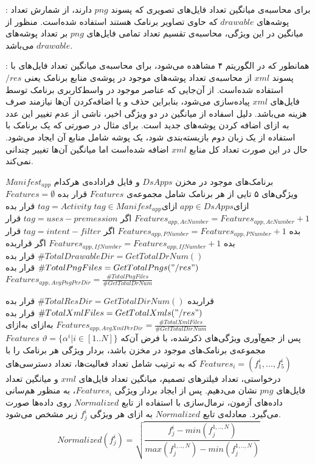 : برای محاسبه‌ی میانگین تعداد فایل‌های تصویری که پسوند $png$ دارند، از شمارش تعداد پوشه‌های $drawable$ که حاوی تصاویر برنامک هستند استفاده شده‌است. منظور از میانگین در این ویژگی، محاسبه‌ی تقسیم تعداد تمامی فایل‌های $png$ بر تعداد پوشه‌های $drawable$ می‌باشد.

:  همانطور که در الگوریتم ۴ مشاهده می‌شود، برای محاسبه‌ی میانگین تعداد فایل‌های با پسوند $xml$ از محاسبه‌ی تعداد پوشه‌های موجود در پوشه‌ی منابع برنامک یعنی $/res$ استفاده شده‌است. از آن‌جایی که عناصر موجود در واسط‌کاربری برنامک توسط فایل‌های $xml$ پیاده‌سازی می‌شود، بنابراین حذف و یا اضافه‌کردن آن‌ها نیازمند صرف هزینه می‌باشد. دلیل اسفاده از میانگین در دو ویژگی اخیر، ناشی از عدم تغییر این عدد به ازای اضافه کردن پوشه‌های جدید است. برای مثال در صورتی که یک برنامک با استفاده از یک زبان دوم بازبسته‌بندی شود، یک پوشه‌ شامل منابع آن ایجاد می‌شود. حال در این صورت تعداد کل منابع $xml$ اضافه شده‌است اما میانگین آن‌ها تغییر چندانی نمی‌کند.


 برنامک‌های موجود در مخزن $DsApps$ و فایل فراداده‌ی هرکدام‌ $Manifest_{app}$
 ویژگی‌های ۵ تایی از هر برنامک شامل مجموعه‌ی $Features$
 قرار بده $Features=\emptyset$
‌ازای{$app \in  DsApps$} 
‌ازای{$tag \in Manifest_{app}$}
 $tag=Activity$
 قرار بده $Features_{app,AcNumber} =Features_{app,AcNumber} + 1 $
‌اگر
 $tag=uses-premession$
 قرار بده $Features_{app,PNumber} =Features_{app,PNumber} + 1 $
‌اگر
 $tag=intent-filter$
 قرار بده $Features_{app,IfNumber} =Features_{app,IfNumber} + 1 $
‌اگر
 قرار‌بده $\#TotalDrawableDir = GetTotalDrNum()$
 قرار بده $\#TotalPngFiles = GetTotalPngs("/res")$
 قرار بده $Features_{app,AvgPngPerDir}=  \frac{\#TotalPngFiles}{\#GetTotalDrNum}$

 قرار‌بده $\#TotalResDir = GetTotalDirNum()$
 قرار بده $\#TotalXmlFiles = GetTotalXmls("/res")$
 قرار بده $Features_{app,AvgXmlPerDir}=  \frac{\#TotalXmlFiles}{\#GetTotalDirNum}$
‌به‌ازای
‌به‌ازای\\
 $Features$
پس از جمع‌آوری ویژگی‌های ذکر‌شده، با فرض آن‌که $ \vartheta =\{\alpha^i | i \in [1..N]\}$
مجموعه‌ی برنامک‌های موجود در مخزن‌ باشد، بردار ویژگی هر برنامک را با 
$Features_{i} =(f^{i}_{1},...,f^{i}_{5})$
که به ترتیب شامل  تعداد فعالیت‌ها، تعداد دسترسی‌های درخواستی، تعداد فیلتر‌های تصمیم، میانگین تعداد فایل‌های $xml$ و میانگین تعداد فایل‌های $png$ نشان می‌دهیم. پس از ایجاد بردار ویژگی $Features_{i}$، به منظور هم‌سانی‌ داده‌های آزمون، نرمال‌سازی با استفاده از تابع $Normalized$ روی داده‌ها صورت می‌گیرد. معادله‌ی تابع $Normalized$ به ازای هر ویژگی $f^{i}_{j}$ زیر مشخص‌ می‌شود.\\
\begin{equation}
Normalized(f^{i}_{j})=\sqrt{\frac{f^{i}_{j}-min(f^{1,..,N}_{j})}{max(f^{1,..,N}_{j})-min(f^{1,..,N}_{j})}}
\end{equation}

